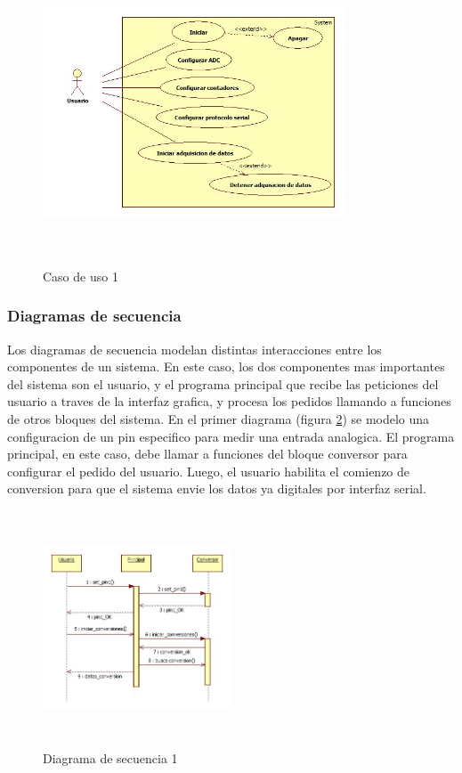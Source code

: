 \documentclass{article}
\theoremstyle{definition}
\theoremstyle{remark}
\begin{document}
\begin{figure}[h]
  \centering
  \includegraphics[width=0.80\textwidth, height = 9cm]{CasoUso1}
  \caption{Caso de uso 1}\label{fig:casouso1}
\end{figure}

\subsubsection{Diagramas de secuencia}
Los diagramas de secuencia modelan distintas interacciones entre los componentes de un sistema. En este caso, los dos componentes mas importantes del sistema son el usuario, y el programa principal que recibe las peticiones del usuario a traves de la interfaz grafica, y procesa los pedidos llamando a funciones de otros bloques del sistema. En el primer diagrama (figura \ref{fig:secuencia1}) se modelo una configuracion de un pin especifico para medir una entrada analogica. El programa principal, en este caso, debe llamar a funciones del bloque conversor para configurar el pedido del usuario. Luego, el usuario habilita el comienzo de conversion para que el sistema envie los datos ya digitales por interfaz serial.

\begin{figure}[h]
  \centering
  \includegraphics[width=0.50\textwidth, height = 7cm]{Secuencia1}
  \caption{Diagrama de secuencia 1}\label{fig:secuencia1}
\end{figure}
\end{document}
